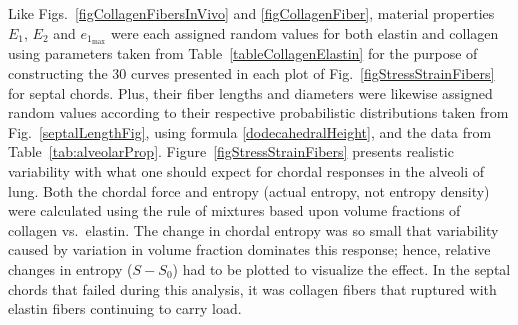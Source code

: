 Like Figs.~\ref{figCollagenFibersInVivo} and \ref{figCollagenFiber}, material properties $E_1$, $E_2$ and $e_{1_{\max}}$ were each assigned random values for both elastin and collagen using parameters taken from Table~\ref{tableCollagenElastin} for the purpose of constructing the 30 curves presented in each plot of Fig.~\ref{figStressStrainFibers} for septal chords.  Plus, their fiber lengths and diameters were likewise assigned random values according to their respective probabilistic distributions taken from Fig.~\ref{septalLengthFig}, using formula \ref{dodecahedralHeight}, and the data from Table~\ref{tab:alveolarProp}.  Figure~\ref{figStressStrainFibers} presents realistic variability with what one should expect for chordal responses in the alveoli of lung.  Both the chordal force and entropy (actual entropy, not entropy density) were calculated using the rule of mixtures based upon volume fractions of collagen vs.\ elastin.  The change in chordal entropy was so small that variability caused by variation in volume fraction dominates this response; hence, relative changes in entropy ($S \! - \! S_0$) had to be plotted to visualize the effect.  In the septal chords that failed during this analysis, it was collagen fibers that ruptured with elastin fibers continuing to carry load.  


